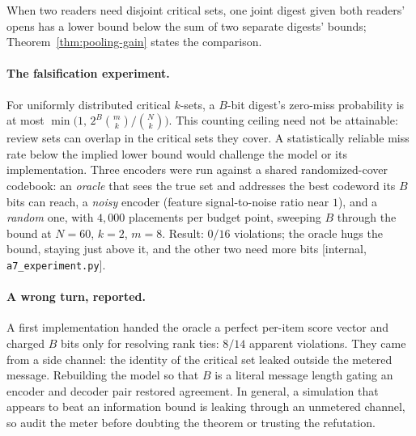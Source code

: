 \documentclass[11pt,a4paper]{article}
\theoremstyle{definition}
\theoremstyle{plain}
\begin{document}
When two readers need disjoint critical sets, one joint digest given both
readers' opens has a lower bound below the sum of two separate digests'
bounds; Theorem~\ref{thm:pooling-gain} states the comparison.

\paragraph{The falsification experiment.} For uniformly distributed critical
$k$-sets, a $B$-bit digest's zero-miss probability is at most
$\min\bigl(1,\,2^B\binom{m}{k}/\binom{N}{k}\bigr)$. This counting ceiling need
not be attainable: review sets can overlap in the critical sets they cover.
A statistically reliable miss rate below the implied lower bound would challenge
the model or its implementation. Three encoders were run against a
shared randomized-cover codebook: an \emph{oracle} that sees the true set and
addresses the best codeword its $B$ bits can reach, a \emph{noisy} encoder (feature
signal-to-noise ratio near $1$), and a \emph{random} one, with $4{,}000$ placements
per budget point, sweeping $B$ through the bound at $N{=}60$, $k{=}2$, $m{=}8$.
Result: $0/16$ violations; the oracle hugs the bound, staying just above it, and
the other two need more bits [internal, \texttt{a7\_experiment.py}].

\paragraph{A wrong turn, reported.} A first implementation handed the oracle a
perfect per-item score vector and charged $B$ bits only for resolving rank ties:
$8/14$ apparent violations. They came from a side channel: the identity of the
critical set leaked outside the metered message. Rebuilding
the model so that $B$ is a literal message length gating an encoder and decoder pair
restored agreement. In general, a simulation that appears to beat an
information bound is leaking through an unmetered channel, so audit the meter before
doubting the theorem or trusting the refutation.
\end{document}
